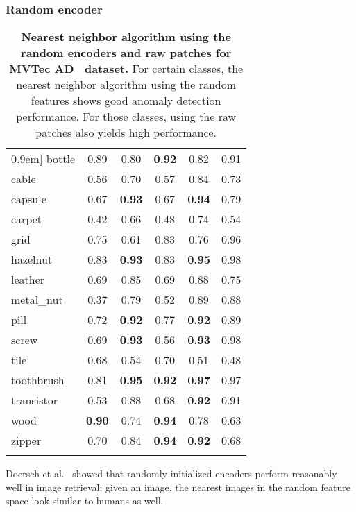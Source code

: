 \documentclass[runningheads]{llncs}
\begin{document}
\subsubsection{Random encoder}
\setlength{\tabcolsep}{0.12in}
\begin{table}[t]
  \centering
  \caption{\textbf{Nearest neighbor algorithm using the random encoders and raw patches for MVTec AD~\cite{mvtecad} dataset.} For certain classes, the nearest neighbor algorithm using the random features shows good anomaly detection performance. For those classes, using the raw patches also yields high performance.}
  \vspace{0.5em}
    \begin{tabular}
    {l @{\hskip 0.1in} |c c |c c |c }
    \Xhline{1pt}\-0.9em]
bottle         & 0.89 & 0.80 & \textbf{0.92 } & 0.82 & 0.91 \\
    cable          & 0.56 & 0.70 & 0.57 & 0.84 & 0.73 \\
    capsule        & 0.67 & \textbf{0.93} & 0.67 & \textbf{0.94} & 0.79 \\
    carpet         & 0.42 & 0.66 & 0.48 & 0.74 & 0.54 \\
    grid           & 0.75 & 0.61 & 0.83 & 0.76 & 0.96 \\
    hazelnut       & 0.83 & \textbf{0.93} & 0.83 & \textbf{0.95} & 0.98 \\
    leather        & 0.69 & 0.85 & 0.69 & 0.88 & 0.75 \\
    metal\_nut     & 0.37 & 0.79 & 0.52 & 0.89 & 0.88 \\
    pill           & 0.72 & \textbf{0.92} & 0.77 & \textbf{0.92} & 0.89 \\
    screw          & 0.69 & \textbf{0.93} & 0.56 & \textbf{0.93} & 0.98 \\
    tile           & 0.68 & 0.54 & 0.70 & 0.51 & 0.48 \\
    toothbrush     & 0.81 & \textbf{0.95} & \textbf{0.92} & \textbf{0.97} & 0.97 \\
    transistor     & 0.53 & 0.88 & 0.68 & \textbf{0.92} & 0.91 \\
    wood           & \textbf{0.90} & 0.74 & \textbf{0.94} & 0.78 & 0.63 \\
    zipper         & 0.70 & 0.84 & \textbf{0.94} & \textbf{0.92} & 0.68 \\
    \Xhline{0.5pt}
\end{tabular}\vspace{0.5mm}
  
  \label{table:random_enc}
\end{table} Doersch et al.~\cite{patch_location} showed that randomly initialized encoders perform reasonably well in image retrieval; given an image, the nearest images in the random feature space look similar to humans as well.
\end{document}
